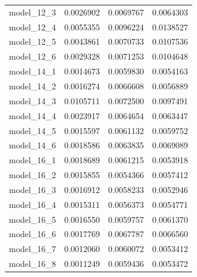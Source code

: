 \begin{longtable}{lrrr}
model\_12\_3 & 0.0026902 & 0.0069767 & 0.0064303 \\
model\_12\_4 & 0.0055355 & 0.0096224 & 0.0138527 \\
model\_12\_5 & 0.0043861 & 0.0070733 & 0.0107536 \\
model\_12\_6 & 0.0029328 & 0.0071253 & 0.0104648 \\
model\_14\_1 & 0.0014673 & 0.0059830 & 0.0054163 \\
model\_14\_2 & 0.0016274 & 0.0066608 & 0.0056889 \\
model\_14\_3 & 0.0105711 & 0.0072500 & 0.0097491 \\
model\_14\_4 & 0.0023917 & 0.0064654 & 0.0063447 \\
model\_14\_5 & 0.0015597 & 0.0061132 & 0.0059752 \\
model\_14\_6 & 0.0018586 & 0.0063835 & 0.0069089 \\
model\_16\_1 & 0.0018689 & 0.0061215 & 0.0053918 \\
model\_16\_2 & 0.0015855 & 0.0054366 & 0.0057412 \\
model\_16\_3 & 0.0016912 & 0.0058233 & 0.0052946 \\
model\_16\_4 & 0.0015311 & 0.0056373 & 0.0054771 \\
model\_16\_5 & 0.0016550 & 0.0059757 & 0.0061370 \\
model\_16\_6 & 0.0017769 & 0.0067787 & 0.0066560 \\
model\_16\_7 & 0.0012060 & 0.0060072 & 0.0053412 \\
model\_16\_8 & 0.0011249 & 0.0059436 & 0.0053472 \\
\end{longtable}\endgroup
